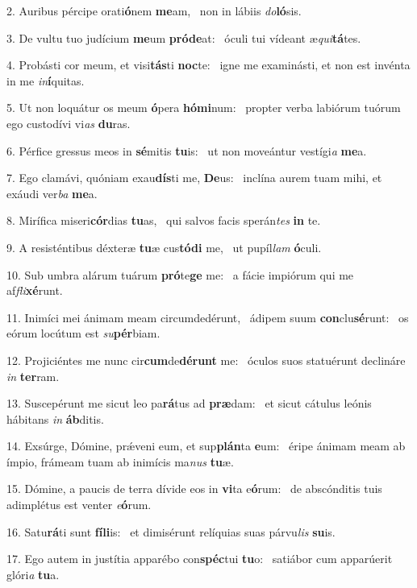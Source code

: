 2. Auribus pércipe orati\textbf{ó}nem \textbf{me}am, \ast\  non in lábiis \textit{do}\textbf{ló}sis.\

3. De vultu tuo judícium \textbf{me}um \textbf{pród}\textbf{e}at: \ast\  óculi tui vídeant æ\textit{qui}\textbf{tá}tes.\

4. Probásti cor meum, et visi\textbf{tás}ti \textbf{noc}te: \ast\  igne me examinásti, et non est invénta in me \textit{in}\textbf{í}quitas.\

5. Ut non loquátur os meum \textbf{ó}pera \textbf{hó}\textbf{mi}num: \ast\  propter verba labiórum tuórum ego custodívi vi\textit{as} \textbf{du}ras.\

6. Pérfice gressus meos in \textbf{sé}mitis \textbf{tu}is: \ast\  ut non moveántur vestígi\textit{a} \textbf{me}a.\

7. Ego clamávi, quóniam exau\textbf{dís}ti me, \textbf{De}us: \ast\  inclína aurem tuam mihi, et exáudi ver\textit{ba} \textbf{me}a.\

8. Mirífica miseri\textbf{cór}dias \textbf{tu}as, \ast\  qui salvos facis sperán\textit{tes} \textbf{in} te.\

9. A resisténtibus déxteræ \textbf{tu}æ cus\textbf{tó}\textbf{di} me, \ast\  ut pupíl\textit{lam} \textbf{ó}culi.\

10. Sub umbra alárum tuárum \textbf{pró}te\textbf{ge} me: \ast\  a fácie impiórum qui me af\textit{fli}\textbf{xé}runt.\

11. Inimíci mei ánimam meam circumdedérunt, \dag\  ádipem suum \textbf{con}clu\textbf{sé}runt: \ast\  os eórum locútum est \textit{su}\textbf{pér}biam.\

12. Projiciéntes me nunc cir\textbf{cum}de\textbf{dé}\textbf{runt} me: \ast\  óculos suos statuérunt declináre \textit{in} \textbf{ter}ram.\

13. Suscepérunt me sicut leo pa\textbf{rá}tus ad \textbf{præ}dam: \ast\  et sicut cátulus leónis hábitans \textit{in} \textbf{áb}ditis.\

14. Exsúrge, Dómine, prǽveni eum, et sup\textbf{plán}ta \textbf{e}um: \ast\  éripe ánimam meam ab ímpio, frámeam tuam ab inimícis ma\textit{nus} \textbf{tu}æ.\

15. Dómine, a paucis de terra dívide eos in \textbf{vi}ta e\textbf{ó}rum: \ast\  de abscónditis tuis adimplétus est venter \textit{e}\textbf{ó}rum.\

16. Satu\textbf{rá}ti sunt \textbf{fí}\textbf{li}is: \ast\  et dimisérunt relíquias suas párvu\textit{lis} \textbf{su}is.\

17. Ego autem in justítia apparébo con\textbf{spéc}tui \textbf{tu}o: \ast\  satiábor cum apparúerit glóri\textit{a} \textbf{tu}a.\


